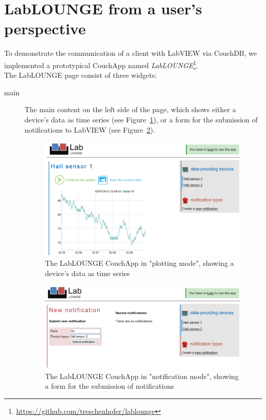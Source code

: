 \section{LabLOUNGE from a user's perspective}
\label{couchapp:labloungeuser}
To demonstrate the communication of a client with LabVIEW via CouchDB, we implemented a prototypical CouchApp named \emph{LabLOUNGE}\footnote{\url{https://github.com/treschenhofer/lablounge}}.\\
The LabLOUNGE page consist of three widgets:
\begin{description}
\item[main] The main content on the left side of the page, which shows either a device's data as time series (see Figure~\ref{img:lablounge01}), or a form for the submission of notifications to LabVIEW (see Figure~\ref{img:lablounge02}).
\begin{figure}[h!]
\centering
\includegraphics[width=1.0\columnwidth]{images/lablounge01.png}
\caption{The LabLOUNGE CouchApp in "plotting mode", showing a device's data as time series}
\label{img:lablounge01}
\end{figure}

\begin{figure}[h!]
\centering
\includegraphics[width=1.0\columnwidth]{images/lablounge02.png}
\caption{The LabLOUNGE CouchApp in "notification mode", showing a form for the submission of notifications}
\label{img:lablounge02}
\end{figure}


\end{description}
